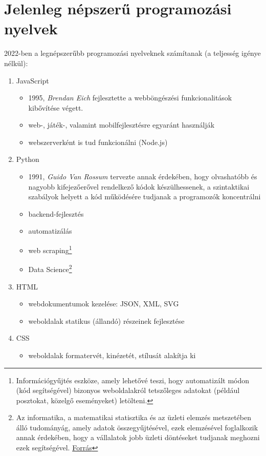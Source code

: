 \documentclass[tocnopagenum]{thesis-ekf}
\theoremstyle{definition}
\theoremstyle{remark}
\begin{document}
	\section{Jelenleg népszerű programozási nyelvek}
	2022-ben a legnépszerűbb programozási nyelveknek számítanak (a teljesség igénye nélkül):
	\begin{enumerate}
		\item JavaScript
		\begin{itemize}
			\item 1995, \textit{Brendan Eich} fejlesztette a webböngészési funkcionalitások kibővítése végett.
			\item web-, játék-, valamint mobilfejlesztésre egyaránt használják
			\item webszerverként is tud funkcionálni (Node.js)
		\end{itemize}
		\item Python
		\begin{itemize}
			\item 1991, \textit{Guido Van Rossum} tervezte annak érdekében, hogy olvashatóbb és nagyobb kifejezőerővel rendelkező kódok készülhessenek, a szintaktikai szabályok helyett a kód működésére tudjanak a programozók koncentrálni
			\item backend-fejlesztés
			\item automatizálás
			\item web scraping\footnote{Információgyűjtés eszköze, amely lehetővé teszi, hogy automatizált módon (kód segítségével) bizonyos weboldalakról tetszőleges adatokat (például posztokat, közelgő eseményeket) letölteni.}
			\item Data Science\footnote{Az informatika, a matematikai statisztika és az üzleti elemzés metszetében álló tudományág, amely adatok összegyűjtésével, ezek elemzésével foglalkozik annak érdekében, hogy a vállalatok jobb üzleti döntéseket tudjanak meghozni ezek segítségével. \hyperref{https://qr.ae/pvlYmQ}{}{}{Forrás}}
		\end{itemize}
		\item HTML
		\begin{itemize}
			\item webdokumentumok kezelése: JSON, XML, SVG
			\item weboldalak statikus (állandó) részeinek fejlesztése
		\end{itemize}
		\item CSS 
		\begin{itemize}
			\item weboldalak formatervét, kinézetét, stílusát alakítja ki

\end{itemize}
\end{enumerate}
\end{document}
